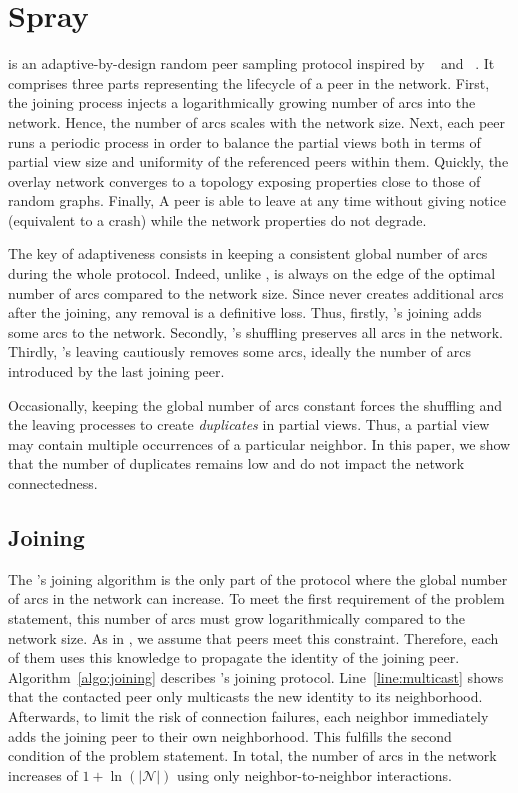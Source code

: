 
\section{Spray}
\label{sec:proposal}

\SPRAY is an adaptive-by-design random peer sampling protocol inspired by
\SCAMP~\cite{ganesh2003peer} and \CYCLON~\cite{voulgaris2005cyclon}. It
comprises three parts representing the lifecycle of a peer in the network.
First, the joining process injects a logarithmically growing number of arcs
into the network. Hence, the number of arcs scales with the network size.  Next,
each peer runs a periodic process in order to balance the partial views both in
terms of partial view size and uniformity of the referenced peers within
them. Quickly, the overlay network converges to a topology exposing properties
close to those of random graphs. Finally, A peer is able to leave at any time 
without giving notice (equivalent to a crash) while the network properties do
not degrade.

The key of adaptiveness consists in keeping a consistent global number of arcs
during the whole protocol. Indeed, unlike \CYCLON, \SPRAY is always on the edge
of the optimal number of arcs compared to the network size. Since \SPRAY never
creates additional arcs after the joining, any removal is a definitive
loss. Thus, firstly, \SPRAY's joining adds some arcs to the network. Secondly,
\SPRAY's shuffling preserves all arcs in the network. Thirdly, \SPRAY's leaving
cautiously removes some arcs, ideally the number of arcs introduced by the last
joining peer.

Occasionally, keeping the global number of arcs constant forces the shuffling
and the leaving processes to create \emph{duplicates} in partial views. Thus,
a partial view may contain multiple occurrences of a particular neighbor. In this
paper, we show that the number of duplicates remains low and do not impact the
network connectedness.

\subsection{Joining}

The \SPRAY's joining algorithm is the only part of the protocol where the
global number of arcs in the network can increase. To meet the first
requirement of the problem statement, this number of arcs must grow
logarithmically compared to the network size. As in \SCAMP, we assume that
peers meet this constraint. Therefore, each of them uses this knowledge to
propagate the identity of the joining peer. Algorithm~\ref{algo:joining}
describes \SPRAY's joining protocol. Line~\ref{line:multicast} shows that
the contacted peer only multicasts the new identity to its
neighborhood. Afterwards, to limit the risk of connection failures, each
neighbor immediately adds the joining peer to their own neighborhood. This
fulfills the second condition of the problem statement.  In total, the number
of arcs in the network increases of $1+\ln(|\mathcal{N}|)$ using only
neighbor-to-neighbor interactions.

